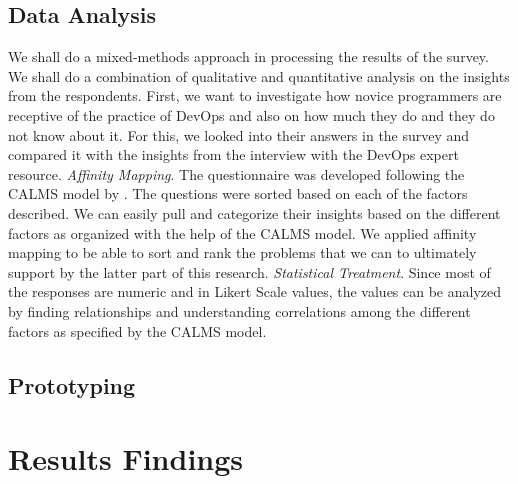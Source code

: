 \documentclass{sigchi}
\begin{document}
\subsection{Data Analysis}
We shall do a mixed-methods approach in processing the results of the survey. We shall do a combination of qualitative and quantitative analysis on the insights from the respondents. First, we want to investigate how novice programmers are receptive of the practice of DevOps and also on how much they do and they do not know about it. For this, we looked into their answers in the survey and compared it with the insights from the interview with the DevOps expert resource. 
\textit{Affinity Mapping}. The questionnaire was developed following the CALMS model by \cite{riley2014keep}. The questions were sorted based on each of the factors described. We can easily pull and categorize their insights based on the different factors as organized with the help of the CALMS model. We applied affinity mapping to be able to sort and rank the problems that we can to ultimately support by the latter part of this research. 
\textit{Statistical Treatment}. Since most of the responses are numeric and in Likert Scale values, the values can be analyzed by finding relationships and understanding correlations among the different factors as specified by the CALMS model. 
\subsection{Prototyping}

\section{Results Findings}
\end{document}

